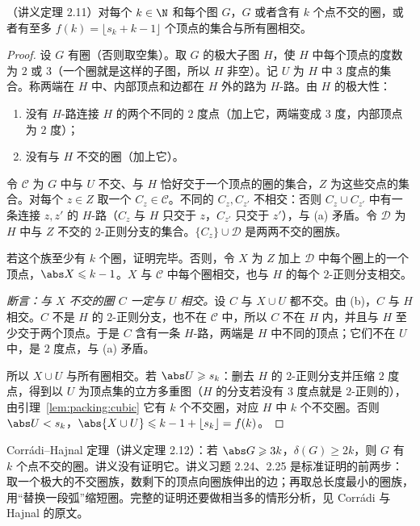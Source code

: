 \begin{theorem}\label{thm:packing:erdos-posa}
（讲义定理 2.11）对每个 $k\in\N$ 和每个图 $G$，$G$ 或者含有 $k$ 个点不交的圈，或者有至多 $f(k)=\lfloor s_k+k-1\rfloor$ 个顶点的集合与所有圈相交。
\end{theorem}
\begin{proof}
设 $G$ 有圈（否则取空集）。取 $G$ 的极大子图 $H$，使 $H$ 中每个顶点的度数为 $2$ 或 $3$（一个圈就是这样的子图，所以 $H$ 非空）。记 $U$ 为 $H$ 中 $3$ 度点的集合。称两端在 $H$ 中、内部顶点和边都在 $H$ 外的路为 $H$-路。由 $H$ 的极大性：
\begin{enumerate}
\item[(a)] 没有 $H$-路连接 $H$ 的两个不同的 $2$ 度点（加上它，两端变成 $3$ 度，内部顶点为 $2$ 度）；
\item[(b)] 没有与 $H$ 不交的圈（加上它）。
\end{enumerate}

令 $\mathcal C$ 为 $G$ 中与 $U$ 不交、与 $H$ 恰好交于一个顶点的圈的集合，$Z$ 为这些交点的集合。对每个 $z\in Z$ 取一个 $C_z\in\mathcal C$。不同的 $C_z,C_{z'}$ 不相交：否则 $C_z\cup C_{z'}$ 中有一条连接 $z,z'$ 的 $H$-路（$C_z$ 与 $H$ 只交于 $z$，$C_{z'}$ 只交于 $z'$），与 (a) 矛盾。令 $\mathcal D$ 为 $H$ 中与 $Z$ 不交的 $2$-正则分支的集合。$\{C_z\}\cup\mathcal D$ 是两两不交的圈族。

若这个族至少有 $k$ 个圈，证明完毕。否则，令 $X$ 为 $Z$ 加上 $\mathcal D$ 中每个圈上的一个顶点，$\abs X\leqslant k-1$。$X$ 与 $\mathcal C$ 中每个圈相交，也与 $H$ 的每个 $2$-正则分支相交。

\emph{断言：与 $X$ 不交的圈 $C$ 一定与 $U$ 相交。}设 $C$ 与 $X\cup U$ 都不交。由 (b)，$C$ 与 $H$ 相交。$C$ 不是 $H$ 的 $2$-正则分支，也不在 $\mathcal C$ 中，所以 $C$ 不在 $H$ 内，并且与 $H$ 至少交于两个顶点。于是 $C$ 含有一条 $H$-路，两端是 $H$ 中不同的顶点；它们不在 $U$ 中，是 $2$ 度点，与 (a) 矛盾。

所以 $X\cup U$ 与所有圈相交。若 $\abs U\geqslant s_k$：删去 $H$ 的 $2$-正则分支并压缩 $2$ 度点，得到以 $U$ 为顶点集的立方多重图（$H$ 的分支若没有 $3$ 度点就是 $2$-正则的），由引理~\ref{lem:packing:cubic} 它有 $k$ 个不交圈，对应 $H$ 中 $k$ 个不交圈。否则 $\abs U<s_k$，$\abs{X\cup U}\leqslant k-1+\lfloor s_k\rfloor=f(k)$。
\end{proof}


Corrádi--Hajnal 定理（讲义定理 2.12）：若 $\abs G\geqslant3k$，$\delta(G)\geqslant2k$，则 $G$ 有 $k$ 个点不交的圈。讲义没有证明它。讲义习题 2.24、2.25 是标准证明的前两步：取一个极大的不交圈族，数剩下的顶点向圈族伸出的边；再取总长度最小的圈族，用“替换一段弧”缩短圈。完整的证明还要做相当多的情形分析，见 Corrádi 与 Hajnal 的原文。

